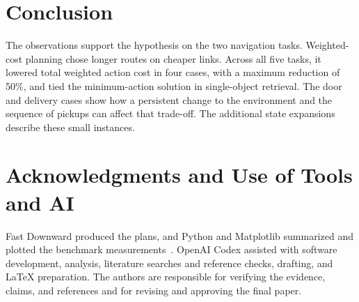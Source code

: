 \documentclass[conference,a4paper]{IEEEtran}
\theoremstyle{plain}
\theoremstyle{definition}
\theoremstyle{remark}
\begin{document}
\section{Conclusion}
The observations support the hypothesis on the two navigation tasks. Weighted-cost planning chose longer routes on cheaper links. Across all five tasks, it lowered total weighted action cost in four cases, with a maximum reduction of 50\%, and tied the minimum-action solution in single-object retrieval. The door and delivery cases show how a persistent change to the environment and the sequence of pickups can affect that trade-off. The additional state expansions describe these small instances.

\section*{Acknowledgments and Use of Tools and AI}
Fast Downward produced the plans, and Python and Matplotlib summarized and plotted the benchmark measurements~\cite{kpisdata}. OpenAI Codex assisted with software development, analysis, literature searches and reference checks, drafting, and LaTeX preparation. The authors are responsible for verifying the evidence, claims, and references and for revising and approving the final paper.

\begingroup
\raggedright


\endgroup
\end{document}
